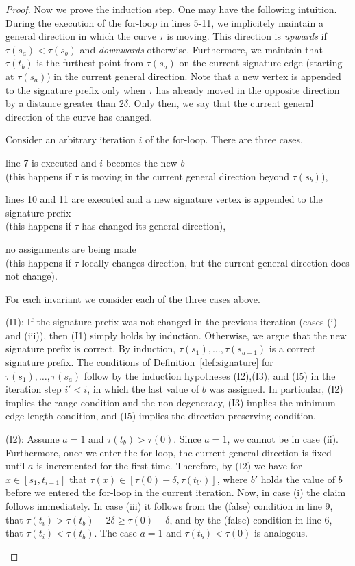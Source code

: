 \documentclass[11pt, letter]{article}
\newcommand{\defref}[1]{Definition~\ref{def:#1}}
\begin{document}
\begin{proof}
Now we prove the induction step.  One may have the following intuition.
During the execution of the for-loop in lines 5-11, we implicitely maintain a
general direction in which the curve $\tau$ is moving. 
This direction is \emph{upwards} if $\tau(s_{a}) < \tau(s_b)$ and
\emph{downwards} otherwise.
Furthermore, we maintain that $\tau(t_b)$ is the furthest point from $\tau(s_a)$
on the current signature edge (starting at $\tau(s_a)$) in the current general
direction.
Note that a new vertex is appended to the signature prefix only when $\tau$ has
already moved in the opposite direction by a distance greater than $2\delta$.
Only then, we say that the current general direction of the curve has changed.

Consider an arbitrary iteration $i$ of the for-loop. There are three cases,
\begin{compactenum}[(i)]
\item line 7 is executed and $i$ becomes the new $b$\\
(this happens if $\tau$ is moving in the current general direction beyond
$\tau(s_b)$),
\item lines 10 and 11 are executed and a new signature vertex is appended to the
signature prefix\\
(this happens if $\tau$ has changed its general direction), 
\item no assignments are being made\\
(this happens if $\tau$ locally changes direction, but the current general
direction does not change).
\end{compactenum}

For each invariant we consider each of the three cases above.
\begin{compactitem}
\item (I1): If the signature prefix was not changed in the previous iteration
(cases (i) and (iii)), then (I1) simply holds by induction. Otherwise, we argue
that the new signature prefix is correct. By induction,
$\tau(s_1),\dots,\tau(s_{a-1})$ is a correct signature prefix.  
The conditions of \defref{signature} for $\tau(s_1),\dots,\tau(s_{a})$ follow by the induction
hypotheses (I2),(I3), and (I5) in the iteration step $i'<i$, in which the last 
value of $b$ was assigned. In particular, (I2) implies the range condition
and the non-degeneracy, (I3) implies the minimum-edge-length condition, and (I5)
implies the direction-preserving condition.

\item (I2): Assume $a=1$ and $\tau(t_b)>\tau(0)$. Since $a=1$, we cannot be in
case (ii). Furthermore, once we enter the for-loop, the current general
direction is fixed until $a$ is incremented for the first time. 
Therefore, by (I2) we have for $x\in\left[ s_1,
t_{i-1}\right]$ that $\tau(x)\in\left[ \tau(0)-\delta, \tau(t_{b'})\right]$,
where $b'$ holds the value of $b$ before we entered the for-loop in the current
iteration.  Now, in case (i) the claim follows immediately.
In case (iii) it follows from the (false) condition in line 9, that
$\tau(t_i) > \tau(t_b)-2\delta \geq \tau(0)-\delta$, and by the (false)
condition in line 6, that $\tau(t_i)<\tau(t_b)$. 
The case $a=1$ and $\tau(t_b)<\tau(0)$ is analogous.


\end{compactitem}
\end{proof}
\end{document}
